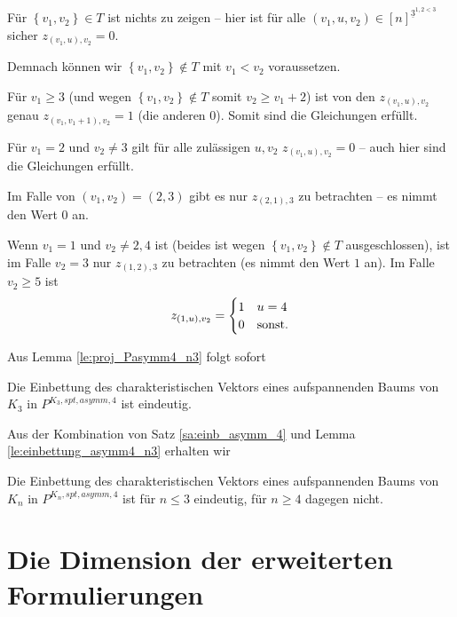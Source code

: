 \documentclass[10p,a4paper,BCOR = 12mm, DIV=15]{scrbook}
\begin{document}
{\begin{bew}
Für $\left\{v_1, v_2\right\} \in T$ ist nichts zu zeigen -- hier ist für alle $\left(v_1, u, v_2\right) \in \left[n\right]^{\underline{3}^{1, 2 < 3}}$ sicher $z_{\left(v_1, u\right), v_2} = 0$.

Demnach können wir $\left\{v_1, v_2\right\} \notin T$ mit $v_1 < v_2$ voraussetzen.

Für $v_1 \geq 3$ (und wegen $\left\{v_1, v_2\right\} \notin T$ somit $v_2 \geq v_1 + 2$) ist von den $z_{\left(v_1, u\right), v_2}$ genau  $z_{\left(v_1, v_1 + 1\right), v_2} = 1$ (die anderen 0). Somit sind die Gleichungen erfüllt.

Für $v_1 = 2$ und $v_2 \neq 3$ gilt für alle zulässigen $u, v_2$  $z_{\left(v_1, u\right), v_2} = 0$ -- auch hier sind die Gleichungen erfüllt.

Im Falle von $\left(v_1, v_2\right) = \left(2, 3\right)$ gibt es nur $z_{\left(2, 1\right), 3}$ zu betrachten -- es nimmt den Wert $0$ an.

Wenn $v_1 = 1$ und $v_2 \neq 2, 4$ ist (beides ist wegen $\left\{v_1, v_2\right\} \notin T$ ausgeschlossen), ist im Falle $v_2 = 3$ nur $z_{\left(1, 2\right), 3}$ zu betrachten (es nimmt den Wert $1$ an). Im Falle $v_2 \geq 5$ ist
\begin{displaymath}
z_{\left(1, u\right), v_2} = \begin{cases}
1 & u=4 \\
0 & \textnormal{sonst}.
\end{cases}
\end{displaymath}
\end{bew}

Aus Lemma \ref{le:proj_Pasymm4_n3} folgt sofort

\begin{Le}
\label{le:einbettung_asymm4_n3}
Die Einbettung des charakteristischen Vektors eines aufspannenden Baums von $K_3$ in $P^{K_3, spt, asymm, 4}$ ist eindeutig.
\end{Le}

Aus der Kombination von Satz \ref{sa:einb_asymm_4} und Lemma \ref{le:einbettung_asymm4_n3} erhalten wir

\begin{Kor}
Die Einbettung des charakteristischen Vektors eines aufspannenden Baums von $K_n$ in $P^{K_n, spt, asymm, 4}$ ist für $n \leq 3$ eindeutig, für $n\geq 4$ dagegen nicht.
\end{Kor}

\chapter{Die Dimension der erweiterten Formulierungen}

}
\end{document}
